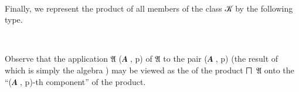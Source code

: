 \ccpad
\begin{code}
\>[0][@{}l@{\AgdaIndent{0}}]%
\>[1]\AgdaSpace{}%
\AgdaSymbol{:}\AgdaSpace{}%
\AgdaSpace{}%
\AgdaSpace{}%
\AgdaSpace{}%
\AgdaSpace{}%
\<%
\\
%
\>[1]\AgdaSpace{}%
\AgdaSymbol{=}\AgdaSpace{}%
\AgdaSpace{}%
\AgdaSymbol{(}\AgdaSpace{}%
\AgdaSymbol{:}\AgdaSpace{}%
\AgdaSymbol{)}\AgdaSpace{}%
\AgdaSpace{}%
\AgdaSpace{}%
\AgdaSpace{}%
\<%
\end{code}
\ccpad
Finally, we represent the product of all members of the class \ab 𝒦 by the following type.
\ccpad
\begin{code}%
\>[0][@{}l@{\AgdaIndent{0}}]%
\>[1]\AgdaSpace{}%
\AgdaSymbol{:}\AgdaSpace{}%
\AgdaSpace{}%
\AgdaSymbol{(}\AgdaSpace{}%
\AgdaSymbol{)}\AgdaSpace{}%
\<%
\\
%
\>[1]\AgdaSpace{}%
\AgdaSymbol{=}\AgdaSpace{}%
\AgdaSpace{}%
\<%
\end{code}
\ccpad
Observe that the application \af 𝔄 (\ab 𝑨 , \ab p) of \af 𝔄 to the pair (\ab 𝑨 , \ab p) (the result of which is simply the algebra ) may be viewed as the  of the product \af ⨅~\af 𝔄 onto the ``(\ab 𝑨 , \ab p)-th component'' of the product.

